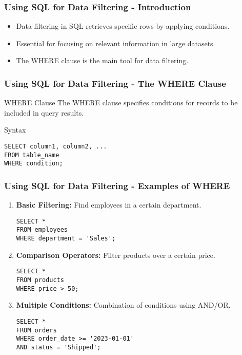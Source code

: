 \documentclass{beamer}
\begin{document}
\begin{frame}[fragile]
    \frametitle{Using SQL for Data Filtering - Introduction}
    \begin{itemize}
        \item Data filtering in SQL retrieves specific rows by applying conditions.
        \item Essential for focusing on relevant information in large datasets.
        \item The WHERE clause is the main tool for data filtering.
    \end{itemize}
\end{frame}

\begin{frame}[fragile]
    \frametitle{Using SQL for Data Filtering - The WHERE Clause}
    \begin{block}{WHERE Clause}
        The WHERE clause specifies conditions for records to be included in query results.
    \end{block}
    
    \begin{block}{Syntax}
        \begin{lstlisting}
SELECT column1, column2, ...
FROM table_name
WHERE condition;
        \end{lstlisting}
    \end{block}
\end{frame}

\begin{frame}[fragile]
    \frametitle{Using SQL for Data Filtering - Examples of WHERE}
    \begin{enumerate}
        \item \textbf{Basic Filtering:} Find employees in a certain department.
        \begin{lstlisting}
SELECT * 
FROM employees 
WHERE department = 'Sales';
        \end{lstlisting}
        
        \item \textbf{Comparison Operators:} Filter products over a certain price.
        \begin{lstlisting}
SELECT * 
FROM products 
WHERE price > 50;
        \end{lstlisting}
        
        \item \textbf{Multiple Conditions:} Combination of conditions using AND/OR.
        \begin{lstlisting}
SELECT * 
FROM orders 
WHERE order_date >= '2023-01-01' 
AND status = 'Shipped';
        \end{lstlisting}
    \end{enumerate}
\end{frame}
\end{document}
